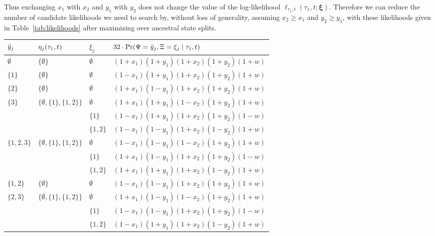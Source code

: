 Thus exchanging $x_1$ with $x_2$ and $y_1$ with $y_2$ does not change the value of the log-likelihood $\ell_{\tau_1,t}(\tau_1, t; \boldsymbol\xi)$.
Therefore we can reduce the number of candidate likelihoods we need to search by, without loss of generality, assuming $x_2 \ge x_1$ and $y_2 \ge y_1$, with these likelihoods given in Table~\ref{tab:likelihoods} after maximizing over ancestral state splits.

\begin{table}
\centering
\begin{tabular}{|lll|l|}
\hline
$\tilde{y}_j$ & $\eta_j(\tau_1, t)$ & $\xi_j$ & $32\cdot\Pr(\Psi=\tilde{y}_j,\Xi=\xi_j \mid \tau_1,t)$\\
\hline
$\emptyset$&$\{\emptyset\}$&$\emptyset$&$(1+x_1)(1+y_1)(1+x_2)(1+y_2)(1+w)$\\

$\{1\}$    &$\{\emptyset\}$&$\emptyset$&$(1-x_1)(1+y_1)(1+x_2)(1+y_2)(1+w)$\\

$\{2\}$    &$\{\emptyset\}$&$\emptyset$&$(1+x_1)(1-y_1)(1+x_2)(1+y_2)(1+w)$\\

$\{3\}$    &$\{\emptyset,\{1\},\{1,2\}\}$&$\emptyset$&$(1+x_1)(1+y_1)(1-x_2)(1+y_2)(1+w)$\\
&&$\{1\}$&$(1-x_1)(1+y_1)(1+x_2)(1+y_2)(1-w)$\\
&&$\{1,2\}$&$(1-x_1)(1-y_1)(1+x_2)(1-y_2)(1+w)$\\

$\{1,2,3\}$&$\{\emptyset,\{1\},\{1,2\}\}$&$\emptyset$&$(1-x_1)(1-y_1)(1-x_2)(1+y_2)(1+w)$\\
&&$\{1\}$&$(1+x_1)(1-y_1)(1+x_2)(1+y_2)(1-w)$\\
&&$\{1,2\}$&$(1+x_1)(1+y_1)(1+x_2)(1-y_2)(1+w)$\\

$\{1,2\}$  &$\{\emptyset\}$&$\emptyset$&$(1-x_1)(1-y_1)(1+x_2)(1+y_2)(1+w)$\\

$\{2,3\}$  &$\{\emptyset,\{1\},\{1,2\}\}$&$\emptyset$&$(1+x_1)(1-y_1)(1-x_2)(1+y_2)(1+w)$\\
&&$\{1\}$&$(1-x_1)(1-y_1)(1+x_2)(1+y_2)(1-w)$\\
&&$\{1,2\}$&$(1-x_1)(1+y_1)(1+x_2)(1-y_2)(1+w)$\\


\end{tabular}
\end{table}
